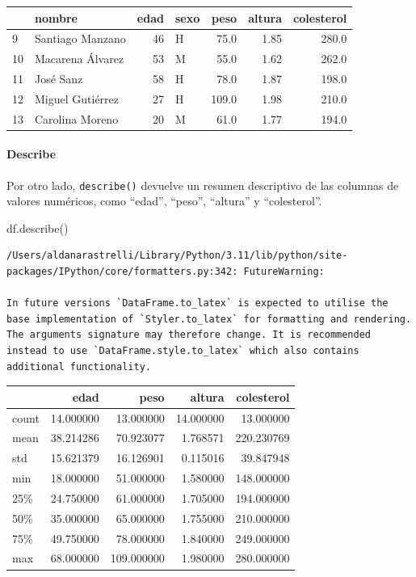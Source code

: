\documentclass[
  letterpaper,
  DIV=11,
  numbers=noendperiod]{scrreprt}
\let\oldparagraph\paragraph
\renewcommand{\paragraph}[1]{\oldparagraph{#1}\mbox{}}
\newenvironment{Shaded}{\begin{snugshade}}{\end{snugshade}}
\newcommand{\NormalTok}[1]{\textcolor[rgb]{0.00,0.23,0.31}{#1}}
\begin{document}
\begin{tabular}{llrlrrr}
\toprule
{} &            nombre &  edad & sexo &   peso &  altura &  colesterol \\
\midrule
9  &  Santiago Manzano &    46 &    H &   75.0 &    1.85 &       280.0 \\
10 &  Macarena Álvarez &    53 &    M &   55.0 &    1.62 &       262.0 \\
11 &         José Sanz &    58 &    H &   78.0 &    1.87 &       198.0 \\
12 &  Miguel Gutiérrez &    27 &    H &  109.0 &    1.98 &       210.0 \\
13 &   Carolina Moreno &    20 &    M &   61.0 &    1.77 &       194.0 \\
\bottomrule
\end{tabular}

\paragraph{Describe}\label{describe}

Por otro lado, \texttt{describe()} devuelve un resumen descriptivo de
las columnas de valores numéricos, como ``edad'', ``peso'', ``altura'' y
``colesterol''.

\begin{Shaded}
\begin{Highlighting}[]
\NormalTok{df.describe()}
\end{Highlighting}
\end{Shaded}

\begin{verbatim}
/Users/aldanarastrelli/Library/Python/3.11/lib/python/site-packages/IPython/core/formatters.py:342: FutureWarning:

In future versions `DataFrame.to_latex` is expected to utilise the base implementation of `Styler.to_latex` for formatting and rendering. The arguments signature may therefore change. It is recommended instead to use `DataFrame.style.to_latex` which also contains additional functionality.
\end{verbatim}

\begin{tabular}{lrrrr}
\toprule
{} &       edad &        peso &     altura &  colesterol \\
\midrule
count &  14.000000 &   13.000000 &  14.000000 &   13.000000 \\
mean  &  38.214286 &   70.923077 &   1.768571 &  220.230769 \\
std   &  15.621379 &   16.126901 &   0.115016 &   39.847948 \\
min   &  18.000000 &   51.000000 &   1.580000 &  148.000000 \\
25\%   &  24.750000 &   61.000000 &   1.705000 &  194.000000 \\
50\%   &  35.000000 &   65.000000 &   1.755000 &  210.000000 \\
75\%   &  49.750000 &   78.000000 &   1.840000 &  249.000000 \\
max   &  68.000000 &  109.000000 &   1.980000 &  280.000000 \\
\bottomrule
\end{tabular}
\end{document}
